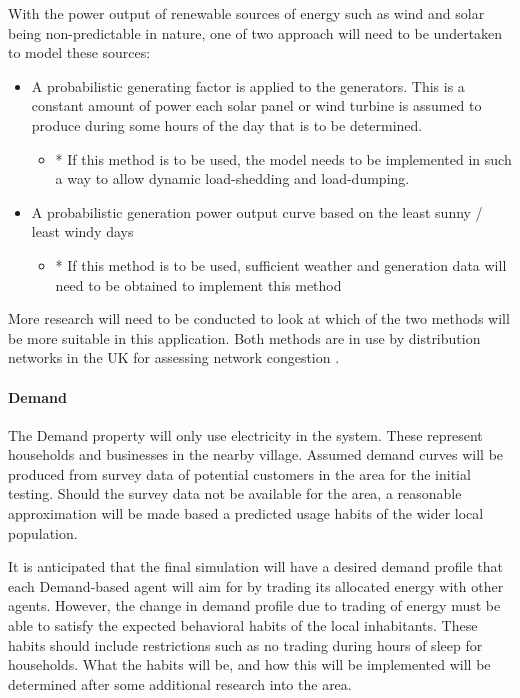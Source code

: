 \documentclass{article}
\begin{document}
With the power output of renewable sources of energy such as wind and solar being non-predictable in nature, one of two approach will need to be undertaken to model these sources:
\begin{itemize}
  \item A probabilistic generating factor is applied to the generators. This is a constant amount of power each solar panel or wind turbine is assumed to produce during some hours of the day that is to be determined. 
  
  \begin{itemize}
    \item * If this method is to be used, the model needs to be implemented in such a way to allow dynamic load-shedding and load-dumping.  
  \end{itemize}
  
  \item A probabilistic generation power output curve based on the least sunny / least windy days
  \begin{itemize}
    \item * If this method is to be used, sufficient weather and generation data will need to be obtained to implement this method
  \end{itemize}
\end{itemize}

More research will need to be conducted to look at which of the two methods will be more suitable in this application. Both methods are in use by distribution networks in the UK for assessing network congestion \cite{IPSA-web-constraint:2015}.

\paragraph{Demand}
The Demand property will only use electricity in the system. These represent households and businesses in the nearby village. Assumed demand curves will be produced from survey data of potential customers in the area for the initial testing. Should the survey data not be available for the area, a reasonable approximation will be made based a predicted usage habits of the wider local population.

It is anticipated that the final simulation will have a desired demand profile that each Demand-based agent will aim for by trading its allocated energy with other agents. However, the change in demand profile due to trading of energy must be able to satisfy the expected behavioral habits of the local inhabitants. These habits should include restrictions such as no trading during hours of sleep for households. What the habits will be, and how this will be implemented will be determined after some additional research into the area.
\end{document}
